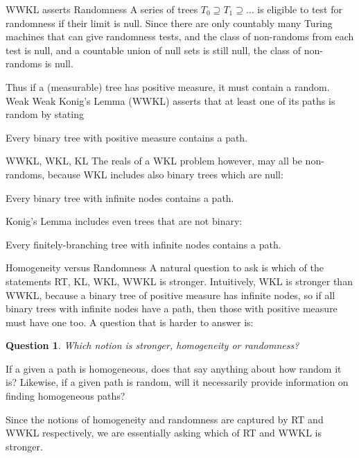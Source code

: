 \begin{frame}{WWKL asserts Randomness}
  A series of trees $T_0\supseteq T_1\supseteq\ldots$ is eligible to
  test for randomness if their limit is null. Since there are
  only countably many Turing machines that can give randomness tests,
  and the class of non-randoms from each test is null, and
  a countable union of null sets is still null, the class of non-randoms
  is null.

  \vspace{2em}
  Thus if a (measurable) tree has positive measure, it must contain a
  random. Weak Weak Konig's Lemma (WWKL) asserts that at least one of its
  paths is random by stating
  \begin{thm*}
    Every binary tree with positive measure contains a path.
  \end{thm*}
\end{frame}

\begin{frame}{WWKL, WKL, KL}
  The reals of a WKL problem however, may all be non-randoms, because WKL
  includes also binary trees which are null:
  \begin{thm*}
    Every binary tree with infinite nodes contains a path.
  \end{thm*}

  \vspace{2em}
  Konig's Lemma includes even trees that are not binary:
  \begin{thm*}
    Every finitely-branching tree with infinite nodes contains a path.
  \end{thm*}
\end{frame}

\begin{frame}{Homogeneity versus Randomness}
  A natural question to ask is which of the statements RT, KL, WKL, WWKL is
  stronger. Intuitively, WKL is stronger than WWKL, because a binary tree
  of positive measure has infinite nodes, so if all binary trees with
  infinite nodes have a path, then those with positive measure must
  have one too. A question that is harder to answer is:
  \newtheorem*{question*}{Question}
  \begin{question*}
    Which notion is stronger, homogeneity or randomness?
  \end{question*}
  If a given a path is homogeneous, does that say anything about how random
  it is? Likewise, if a given path is random, will it necessarily provide
  information on finding homogeneous paths?

  \vspace{0.5em}
  Since the notions of homogeneity and randomness are captured by RT and
  WWKL respectively, we are essentially asking which of RT and WWKL is
  stronger.
\end{frame}

